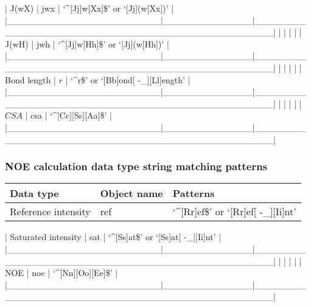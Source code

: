 | J(wX)                  | jwx          | `\^{}[Jj]w[Xx]\$' or `[Jj](w[Xx])'                   |
|\_\_\_\_\_\_\_\_\_\_\_\_\_\_\_\_\_\_\_\_\_\_\_\_|\_\_\_\_\_\_\_\_\_\_\_\_\_\_|\_\_\_\_\_\_\_\_\_\_\_\_\_\_\_\_\_\_\_\_\_\_\_\_\_\_\_\_\_\_\_\_\_\_\_\_\_\_\_\_\_\_\_\_\_\_\_\_\_\_|
|                        |              |                                                  |
| J(wH)                  | jwh          | `\^{}[Jj]w[Hh]\$' or `[Jj](w[Hh])'                   |
|\_\_\_\_\_\_\_\_\_\_\_\_\_\_\_\_\_\_\_\_\_\_\_\_|\_\_\_\_\_\_\_\_\_\_\_\_\_\_|\_\_\_\_\_\_\_\_\_\_\_\_\_\_\_\_\_\_\_\_\_\_\_\_\_\_\_\_\_\_\_\_\_\_\_\_\_\_\_\_\_\_\_\_\_\_\_\_\_\_|
|                        |              |                                                  |
| Bond length            | $r$            | `\^{}r\$' or `[Bb]ond[ -\_][Ll]ength'                 |
|\_\_\_\_\_\_\_\_\_\_\_\_\_\_\_\_\_\_\_\_\_\_\_\_|\_\_\_\_\_\_\_\_\_\_\_\_\_\_|\_\_\_\_\_\_\_\_\_\_\_\_\_\_\_\_\_\_\_\_\_\_\_\_\_\_\_\_\_\_\_\_\_\_\_\_\_\_\_\_\_\_\_\_\_\_\_\_\_\_|
|                        |              |                                                  |
| $CSA$                    | csa          | `\^{}[Cc][Ss][Aa]\$'                                 |
|\_\_\_\_\_\_\_\_\_\_\_\_\_\_\_\_\_\_\_\_\_\_\_\_|\_\_\_\_\_\_\_\_\_\_\_\_\_\_|\_\_\_\_\_\_\_\_\_\_\_\_\_\_\_\_\_\_\_\_\_\_\_\_\_\_\_\_\_\_\_\_\_\_\_\_\_\_\_\_\_\_\_\_\_\_\_\_\_\_|




\subsubsection{NOE calculation data type string matching patterns}



\begin{center}
\begin{tabular}{lll}
\toprule
Data type & Object name & Patterns \\
\midrule
 Reference intensity     &  ref           &  `\^{}[Rr]ef\$' or `[Rr]ef[ -\_][Ii]nt'                 \\
\bottomrule
\end{tabular}
\end{center}

| Saturated intensity    | sat          | `\^{}[Ss]at\$' or `[Ss]at[ -\_][Ii]nt'                |
|\_\_\_\_\_\_\_\_\_\_\_\_\_\_\_\_\_\_\_\_\_\_\_\_|\_\_\_\_\_\_\_\_\_\_\_\_\_\_|\_\_\_\_\_\_\_\_\_\_\_\_\_\_\_\_\_\_\_\_\_\_\_\_\_\_\_\_\_\_\_\_\_\_\_\_\_\_\_\_\_\_\_\_\_\_\_\_\_\_|
|                        |              |                                                  |
| NOE                    | noe          | `\^{}[Nn][Oo][Ee]\$'                                 |
|\_\_\_\_\_\_\_\_\_\_\_\_\_\_\_\_\_\_\_\_\_\_\_\_|\_\_\_\_\_\_\_\_\_\_\_\_\_\_|\_\_\_\_\_\_\_\_\_\_\_\_\_\_\_\_\_\_\_\_\_\_\_\_\_\_\_\_\_\_\_\_\_\_\_\_\_\_\_\_\_\_\_\_\_\_\_\_\_\_|


